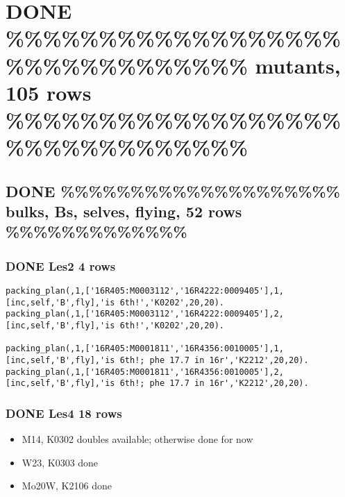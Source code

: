 \documentclass[11pt]{article}
\begin{document}
\section{{\bfseries\sffamily DONE} \%\%\%\%\%\%\%\%\%\%\%\%\%\%\%\%\%\%\%\%\%\%\%\%\%\%\%\%\%\%\% mutants, 105 rows \%\%\%\%\%\%\%\%\%\%\%\%\%\%\%\%\%\%\%\%\%\%\%\%\%\%\%\%\%\%\%}
\label{sec-4}

\subsection{{\bfseries\sffamily DONE} \%\%\%\%\%\%\%\%\%\%\%\%\%\%\%\%\%\%\%\% bulks, Bs, selves, flying, 52 rows \%\%\%\%\%\%\%\%\%\%\%\%\%}
\label{sec-4-1}

\subsubsection{{\bfseries\sffamily DONE} Les2  4 rows}
\label{sec-4-1-1}

\begin{verbatim}
packing_plan(,1,['16R405:M0003112','16R4222:0009405'],1,[inc,self,'B',fly],'is 6th!','K0202',20,20).
packing_plan(,1,['16R405:M0003112','16R4222:0009405'],2,[inc,self,'B',fly],'is 6th!','K0202',20,20).

packing_plan(,1,['16R405:M0001811','16R4356:0010005'],1,[inc,self,'B',fly],'is 6th!; phe 17.7 in 16r','K2212',20,20).
packing_plan(,1,['16R405:M0001811','16R4356:0010005'],2,[inc,self,'B',fly],'is 6th!; phe 17.7 in 16r','K2212',20,20).
\end{verbatim}


\subsubsection{{\bfseries\sffamily DONE} Les4 18 rows}
\label{sec-4-1-2}

\begin{itemize}
\item M14, K0302 doubles available; otherwise done for now

\item W23, K0303 done

\item Mo20W, K2106 done
\end{itemize}
\end{document}
